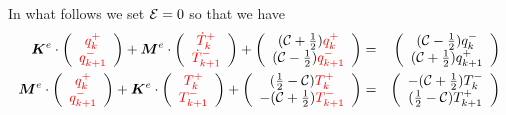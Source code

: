In what follows we set ${\cal E}=0$ so that we have
\begin{eqnarray}
{\bm K}^e \cdot 
\left( 
\begin{array}{cc}
    {\color{red}q_k^+}  \\
    {\color{red}q_{k+1}^-}
\end{array}
\right)
+
{\bm M}^e \cdot 
\left(
\begin{array}{c}
{\color{red}\dot{T}_k^+}  \\
{\color{red}\dot{T}_{k+1}^-} 
\end{array}
\right) 
+ 
\left(
\begin{array}{cc}
     ({\cal C}+\frac{1}{2})  {\color{red}q_k^+}  \\
     ({\cal C}-\frac{1}{2})  {\color{red}q_{k+1}^-} 
\end{array}
\right)
&=& 
\left(
\begin{array}{cc}
     ({\cal C}-\frac{1}{2}) q_k^-  \\
     ({\cal C}+\frac{1}{2}) q_{k+1}^+ 
\end{array}
\right)
\nonumber
\\
{\bm M}^e \cdot
\left(
\begin{array}{cc}
    {\color{red}q_k^+}  \\
    {\color{red}q_{k+1}^-}
\end{array}
\right)+
{\bm K}^e \cdot
\left(
\begin{array}{cc}
 {\color{red}T_k^+}  \\
{\color{red}T_{k+1}^-} 
\end{array}
\right) 
+ \left(
\begin{array}{cc}
     (\frac{1}{2}-{\cal C}) {\color{red}T_k^+}  \\
     -({\cal C}+\frac{1}{2}){\color{red}T_{k+1}^-} 
\end{array}
\right)
&=& \left(
\begin{array}{cc}
     -({\cal C}+\frac{1}{2})  T_k^- \\
     (\frac{1}{2}-{\cal C})  T_{k+1}^+ 
\end{array}
\right) 
\end{eqnarray}

